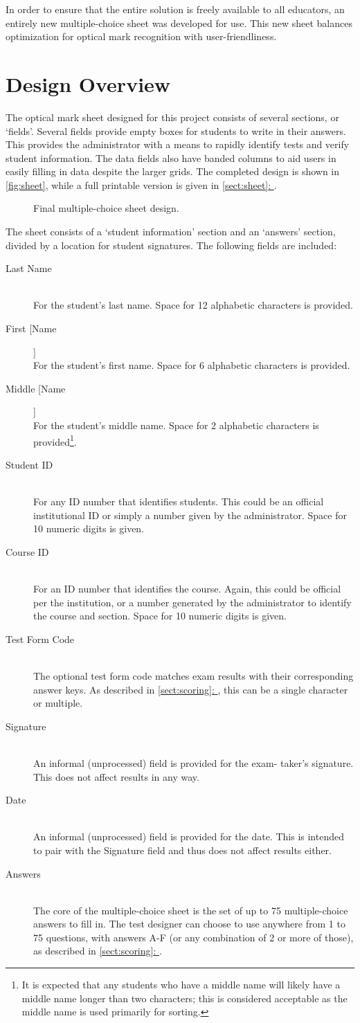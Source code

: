 \documentclass[12pt, letterpaper]{report}
\newcommand*{\sectref}[1]{\hyperref[{#1}]{\ref*{#1}: \nameref*{#1}}}
\newcommand*{\itemref}[1]{\hyperref[{#1}]{\autoref*{#1}}}
\newcommand*{\boxedimage}[1]{\fbox{\texttt{[image: img/\#1]}}}
\newcommand{\fig}[3]{
  \begin{figure}[!htbp]
    \caption{#1}
    \label{#3}
    \centering
    \boxedimage{#2}
  \end{figure}
}
\newcommand*{\descitem}[1]{\item[#1] \hfill \\ }
\begin{document}
In order to ensure that the entire solution is freely available to all
educators, an entirely new multiple-choice sheet was developed for use.
This new sheet balances optimization for optical mark recognition with
user-friendliness.

\section{Design Overview}
The optical mark sheet designed for this project consists of several sections,
or `fields'. Several fields provide empty boxes for students to write in their
answers. This provides the administrator with a means to rapidly identify tests
and verify student information. The data fields
also have banded columns to aid users in easily filling in data despite the
larger grids. The completed design is shown in
\itemref{fig:sheet}, while a full printable version is given in \sectref{sect:sheet}.

\fig{Final multiple-choice sheet design.}{sheet.png}{fig:sheet}

The sheet consists of a `student information' section and an `answers' section,
divided by a location for student signatures. The following fields are
included:
\begin{description}
  \descitem{Last Name} For the student's last name. Space for 12 alphabetic
  characters is provided.
  \descitem{First [Name]} For the student's first name. Space for 6 alphabetic
  characters is provided.
  \descitem{Middle [Name]} For the student's middle name. Space for 2 alphabetic
  characters is provided\footnote{It is expected that any students who have a
  middle name will likely have a middle name longer than two characters; this
  is considered acceptable as the middle name is used primarily for sorting.}.
  \descitem{Student ID} For any ID number that identifies students. This could be an
  official institutional ID or simply a number given by the administrator. Space
  for 10 numeric digits is given.
  \descitem{Course ID} For an ID number that identifies the course. Again, this
  could be official per the institution, or a number generated by the
  administrator to identify the course and section. Space for 10 numeric digits
  is given.
  \descitem{Test Form Code} The optional test form code matches exam results with
  their corresponding answer keys. As described in \sectref{sect:scoring}, this can
  be a single character or multiple.
  \descitem{Signature} An informal (unprocessed) field is provided for the exam-
  taker's signature. This does not affect results in any way.
  \descitem{Date} An informal (unprocessed) field is provided for the date. This is
  intended to pair with the Signature field and thus does not affect results
  either.
  \descitem{Answers} The core of the multiple-choice sheet is the set of up to 75
  multiple-choice answers to fill in. The test designer can choose to use
  anywhere from 1 to 75 questions, with answers A-F (or any combination of 2 or
  more of those), as described in \sectref{sect:scoring}.
\end{description}
\end{document}
